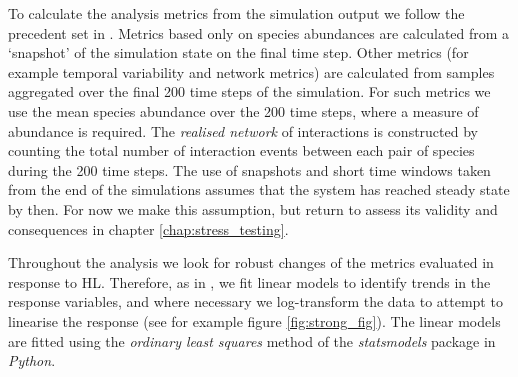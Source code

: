 To calculate the analysis metrics from the simulation output we follow the precedent set in \cite{lurgi2015effects}. Metrics based only on species abundances are calculated from a `snapshot' of the simulation state on the final time step. Other metrics (for example temporal variability and network metrics) are calculated from samples aggregated over the final 200 time steps of the simulation. For such metrics we use the mean species abundance over the 200 time steps, where a measure of abundance is required. The \emph{realised network} of interactions is constructed by counting the total number of interaction events between each pair of species during the 200 time steps. The use of snapshots and short time windows taken from the end of the simulations assumes that the system has reached steady state by then. For now we make this assumption, but return to assess its validity and consequences in chapter \ref{chap:stress_testing}.

Throughout the analysis we look for robust changes of the metrics evaluated in response to HL. Therefore, as in \cite{lurgi2015effects}, we fit linear models to identify  trends in the response variables, and where necessary we log-transform the data to attempt to linearise the response (see for example figure \ref{fig:strong_fig}). The linear models are fitted using the \emph{ordinary least squares} method of the \emph{statsmodels} package in \emph{Python}.  

